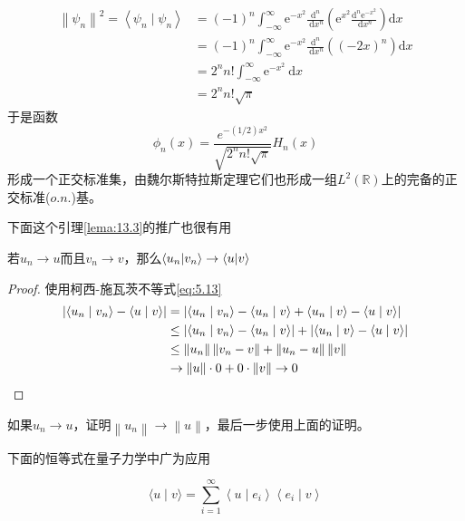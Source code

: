 \begin{eg}
$$
\begin{aligned}
\left\|\psi_{n}\right\|^{2}=\left\langle\psi_{n} \mid \psi_{n}\right\rangle &=(-1)^{n} \int_{-\infty}^{\infty} \mathrm{e}^{-x^{2}} \frac{\mathrm{d}^{n}}{\mathrm{~d} x^{n}}\left(\mathrm{e}^{x^{2}} \frac{\mathrm{d}^{n} \mathrm{e}^{-x^{2}}}{\mathrm{~d} x^{n}}\right) \mathrm{d} x \\
&=(-1)^{n} \int_{-\infty}^{\infty} \mathrm{e}^{-x^{2}} \frac{\mathrm{d}^{n}}{\mathrm{~d} x^{n}}\left((-2 x)^{n}\right) \mathrm{d} x \\
&=2^{n} n ! \int_{-\infty}^{\infty} \mathrm{e}^{-x^{2}} \mathrm{~d} x \\
&=2^{n} n ! \sqrt{\pi}
\end{aligned}
$$
于是函数
\begin{equation}
    \phi_n(x)=\frac{e^{-(1/2)x^2}}{\sqrt{2^{n} n ! \sqrt{\pi}}}H_n(x)
\end{equation}
形成一个正交标准集，由魏尔斯特拉斯定理它们也形成一组\(L^2(\mathbb{R})\)上的完备的正交标准(\(o.n.\))基。
\end{eg}
下面这个引理\ref{lema:13.3}的推广也很有用
\begin{lemma}\label{lema:13.5}
    若\(u_n\rightarrow u\)而且\(v_n\rightarrow v\)，那么\(\braket{u_n|v_n}\rightarrow \braket{u|v}\)
\end{lemma}
\begin{proof}
    使用柯西-施瓦茨不等式\ref{eq:5.13}
    $$
\begin{aligned}
\left|\left\langle u_{n} \mid v_{n}\right\rangle-\langle u \mid v\rangle\right| &=\left|\left\langle u_{n} \mid v_{n}\right\rangle-\left\langle u_{n} \mid v\right\rangle+\left\langle u_{n} \mid v\right\rangle-\langle u \mid v\rangle\right| \\
& \leq\left|\left\langle u_{n} \mid v_{n}\right\rangle-\left\langle u_{n} \mid v\right\rangle\right|+\left|\left\langle u_{n} \mid v\right\rangle-\langle u \mid v\rangle\right| \\
& \leq\left\|u_{n}\right\|\left\|v_{n}-v\right\|+\left\|u_{n}-u\right\|\|v\| \\
& \rightarrow\|u\| \cdot 0+0 \cdot \|v\| \rightarrow 0  \qedhere 
\end{aligned}
$$
\end{proof}
\begin{exercise}
    如果\(u_n\rightarrow u\)，证明\(\left\lVert u_n\right\rVert\rightarrow\left\lVert u\right\rVert  \)，最后一步使用上面的证明。
\end{exercise}
下面的恒等式在量子力学中广为应用
\begin{theorem}[Parseval恒等式]
    \begin{equation}
        \langle u \mid v\rangle=\sum_{i=1}^{\infty}\left\langle u \mid e_{i}\right\rangle\left\langle e_{i} \mid v\right\rangle \label{eq:13.7}
    \end{equation}
\end{theorem}
